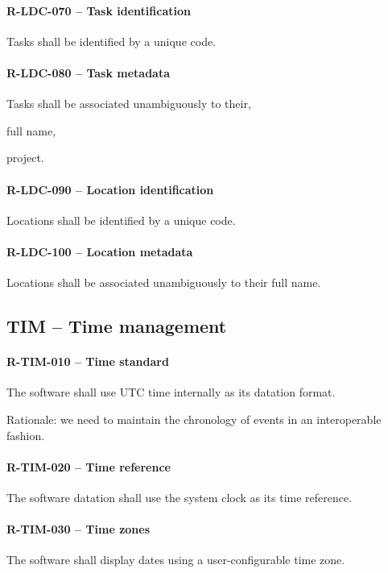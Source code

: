 \paragraph{R-LDC-070 -- Task identification}
Tasks shall be identified by a unique code.

\paragraph{R-LDC-080 -- Task metadata}
Tasks shall be associated unambiguously to their,
\begin{compactitem}
  \item full name,
  \item project.
  \end{compactitem}

\paragraph{R-LDC-090 -- Location identification}
Locations shall be identified by a unique code.

\paragraph{R-LDC-100 -- Location metadata}
Locations shall be associated unambiguously to their full name.

\subsection{TIM -- Time management}
\paragraph{R-TIM-010 -- Time standard}
The software shall use \gls{UTC} time internally as its datation format.

Rationale: we need to maintain the chronology of events in an interoperable
fashion.

\paragraph{R-TIM-020 -- Time reference}
The software datation shall use the system clock as its time reference.

\paragraph{R-TIM-030 -- Time zones}
The software shall display dates using a user-configurable time zone.

